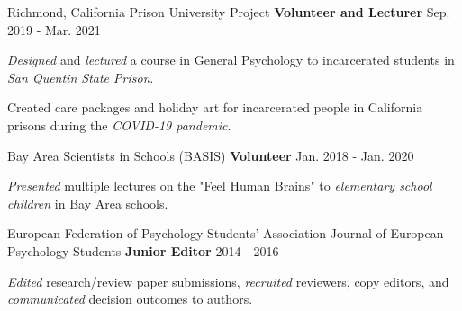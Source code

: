 \begin{cventries}
    
  \cventry
    {Richmond, California} %
    {Prison University Project}
    {\textbf{Volunteer and Lecturer}} %
    {Sep. 2019 - Mar. 2021} %
    {
      \begin{cvitems} %
        \item {\textit{Designed} and \textit{lectured} a course in General Psychology to incarcerated students in \textit{San Quentin State Prison}.}
        \item {Created care packages and holiday art for incarcerated people in California prisons during the \textit{COVID-19 pandemic}.}
      \end{cvitems}
    }
    
  \cventry
  	{} %
  	{Bay Area Scientists in Schools (BASIS)}
    {\textbf{Volunteer}} %
    {Jan. 2018 - Jan. 2020} %
    {
      \begin{cvitems} %
        \item {\textit{Presented} multiple lectures on the "Feel Human Brains" to \textit{elementary school children} in Bay Area schools.}
      \end{cvitems}
    }
    
  \cventry
    {European Federation of Psychology Students' Association}
    {Journal of European Psychology Students} %
    {\textbf{Junior Editor}} %
    {2014 - 2016} %
    {
      \begin{cvitems} %
        \item {\textit{Edited} research/review paper submissions, \textit{recruited} reviewers, copy editors, and \textit{communicated} decision outcomes to authors.}
      \end{cvitems}
    }
    
    
\end{cventries}
    
